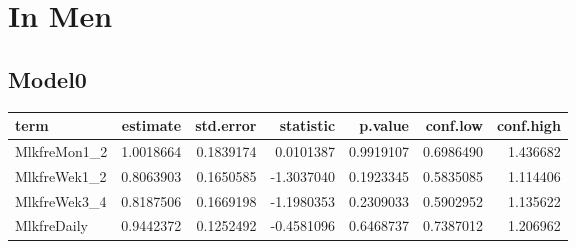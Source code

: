 \documentclass[]{article}
\newenvironment{Shaded}{\begin{snugshade}}{\end{snugshade}}
\newcommand{\CommentTok}[1]{\textcolor[rgb]{0.56,0.35,0.01}{\textit{#1}}}
\newcommand{\DataTypeTok}[1]{\textcolor[rgb]{0.13,0.29,0.53}{#1}}
\newcommand{\KeywordTok}[1]{\textcolor[rgb]{0.13,0.29,0.53}{\textbf{#1}}}
\newcommand{\NormalTok}[1]{#1}
\newcommand{\OperatorTok}[1]{\textcolor[rgb]{0.81,0.36,0.00}{\textbf{#1}}}
\newcommand{\OtherTok}[1]{\textcolor[rgb]{0.56,0.35,0.01}{#1}}
\newcommand{\StringTok}[1]{\textcolor[rgb]{0.31,0.60,0.02}{#1}}
\begin{document}
\begin{Shaded}
\end{Shaded}

\hypertarget{in-men-1}{%
\section{In Men}\label{in-men-1}}

\hypertarget{model0-2}{%
\subsection{Model0}\label{model0-2}}

\begin{Shaded}
\end{Shaded}

\begin{longtable}[]{@{}lrrrrrr@{}}
\toprule
term & estimate & std.error & statistic & p.value & conf.low &
conf.high\tabularnewline
\midrule
\endhead
MlkfreMon1\_2 & 1.0018664 & 0.1839174 & 0.0101387 & 0.9919107 &
0.6986490 & 1.436682\tabularnewline
MlkfreWek1\_2 & 0.8063903 & 0.1650585 & -1.3037040 & 0.1923345 &
0.5835085 & 1.114406\tabularnewline
MlkfreWek3\_4 & 0.8187506 & 0.1669198 & -1.1980353 & 0.2309033 &
0.5902952 & 1.135622\tabularnewline
MlkfreDaily & 0.9442372 & 0.1252492 & -0.4581096 & 0.6468737 & 0.7387012
& 1.206962\tabularnewline
\bottomrule
\end{longtable}
\end{document}

